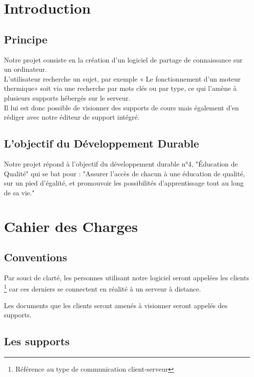 

\newcommand{\cl}{client }
\newcommand{\cls}{clients }

\chapter{Introduction}

\section{Principe}

Notre projet consiste en la création d’un logiciel de partage de connaissance sur un ordinateur.\\
L’utilisateur recherche un sujet, par exemple « Le fonctionnement d'un moteur thermique» soit via une recherche par mots clés ou par type, ce qui l’amène à plusieurs supports hébergés sur le serveur.\\
Il lui est donc possible de visionner des supports de cours mais également d'en rédiger avec notre éditeur de support intégré.

\section{L'objectif du Développement Durable}

Notre projet répond à l'objectif du développement durable n°4, "Éducation de Qualité" qui se bat pour : "Assurer l'accès de chacun à une éducation de qualité, sur un pied d'égalité, et promouvoir les possibilités d'apprentissage tout au long de sa vie."

\chapter{Cahier des Charges}

\section{Conventions}

Par souci de clarté, les personnes utilisant notre logiciel seront appelées les \cls \footnote{Référence au type de communication client-serveur} car ces derniers se connectent en réalité à un serveur à distance.

Les documents que les \cls seront amenés à visionner seront appelés des supports.

\section{Les supports}

